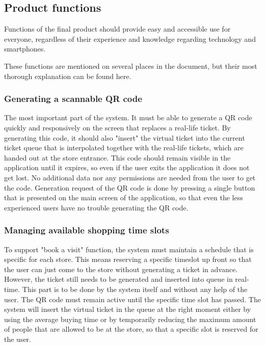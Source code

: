 \newpage

\subsection{Product functions}
\hspace{\parindent}Functions of the final product should provide easy and accessible use for everyone, regardless of their experience and knowledge regarding technology and smartphones. 

These functions are mentioned on several places in the document, but their most thorough explanation can be found here.

\subsubsection{Generating a scannable QR code}

\hspace{\parindent}The most important part of the system. It must be able to generate a QR code quickly and responsively on the screen that replaces a real-life ticket. By generating this code, it should also "insert" the virtual ticket into the current ticket queue that is interpolated together with the real-life tickets, which are handed out at the store entrance. This code should remain visible in the application until it expires, so even if the user exits the application it does not get lost. No additional data nor any permissions are needed from the user to get the code. Generation request of the QR code is done by pressing a single button that is presented on the main screen of the application, so that even the less experienced users have no trouble generating the QR code. 
\subsubsection{Managing available shopping time slots}

\hspace{\parindent}
To support "book a visit" function, the system must maintain a schedule that is specific for each store. This means reserving a specific timeslot up front so that the user can just come to the store without generating a ticket in advance. However, the ticket still needs to be generated and inserted into queue in real-time. This part is to be done by the system itself and without any help of the user. The QR code must remain active until the specific time slot has passed. The system will insert the virtual ticket in the queue at the right moment either by using the average buying time or by  temporarily reducing the maximum amount of people that are allowed to be at the store, so that a specific slot is reserved for the user.


